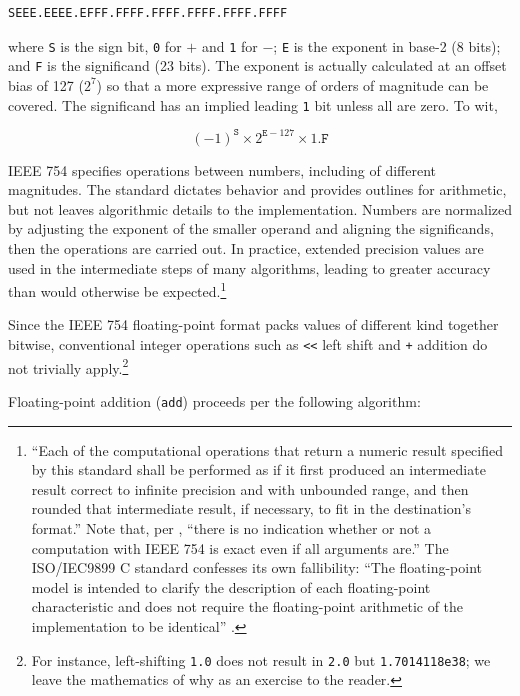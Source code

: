 \documentclass[twoside]{article}
\begin{document}
\begin{lstlisting}
SEEE.EEEE.EFFF.FFFF.FFFF.FFFF.FFFF.FFFF
\end{lstlisting}

where \texttt{S} is the sign bit, \texttt{0} for $+$ and \texttt{1} for $-$; \texttt{E} is the exponent in base-2 (8 bits); and \texttt{F} is the significand (23 bits).  The exponent is actually calculated at an offset bias of 127 ($2^{7}$) so that a more expressive range of orders of magnitude can be covered.  The significand has an implied leading \texttt{1} bit unless all are zero.  To wit,

$$
(-1)^{\texttt{S}} \times 2^{\texttt{E}-127} \times 1.\texttt{F}
$$

IEEE 754 specifies operations between numbers, including of different magnitudes.  The standard dictates behavior and provides outlines for arithmetic, but not leaves algorithmic details to the implementation.  Numbers are normalized by adjusting the exponent of the smaller operand and aligning the significands, then the operations are carried out.  In practice, extended precision values are used in the intermediate steps of many algorithms, leading to greater accuracy than would otherwise be expected.\footnote{“Each of the computational operations that return a numeric result specified by this standard shall be performed as if it first produced an intermediate result correct to infinite precision and with unbounded range, and then rounded that intermediate result, if necessary, to fit in the destination’s format.”  \citep{IEEE754-2008}  Note that, per \citeauthor{Risse2016}, “there is no indication whether or not a computation with IEEE 754 is exact even if all arguments are.”  The ISO/IEC9899 C standard confesses its own fallibility:  “The floating-point model is intended to clarify the description of each floating-point characteristic and does not require the floating-point arithmetic of the implementation to be identical” \citep[fn.~21]{ISO9899}.}

Since the IEEE 754 floating-point format packs values of different kind together bitwise, conventional integer operations such as \texttt{<<} left shift and \texttt{+} addition do not trivially apply.\footnote{For instance, left-shifting \texttt{1.0} does not result in \texttt{2.0} but \texttt{1.7014118e38}; we leave the mathematics of why as an exercise to the reader.}

Floating-point addition (\texttt{add}) proceeds per the following algorithm:
\end{document}

